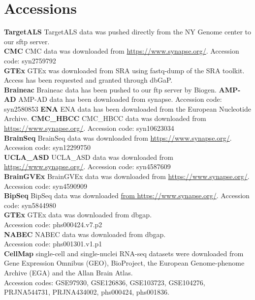 \section*{Accessions}
\textbf{TargetALS} TargetALS data was pushed directly from the NY Genome center to our sftp server. \\
\textbf{CMC} CMC data was downloaded from \url{https://www.synapse.org/}. Accession code: syn2759792 \\
\textbf{GTEx} GTEx was downloaded from SRA using fastq-dump of the SRA toolkit. Access has been requested and granted through dbGaP. \\
\textbf{Braineac} Braineac data has been pushed to our ftp server by Biogen. 
\textbf{AMP-AD} AMP-AD data has been downloaded from synapse. Accession code: syn2580853 
\textbf{ENA} ENA data has been downloaded from the European Nucleotide Archive.
\textbf{CMC\_HBCC} CMC\_HBCC data was downloaded from \url{https://www.synapse.org/}. Accession code: syn10623034 \\
\textbf{BrainSeq} BrainSeq data was downloaded from \url{https://www.synapse.org/}. Accession code: syn12299750 \\
\textbf{UCLA\_ASD} UCLA\_ASD data was downloaded from \url{https://www.synapse.org/}. Accession code: syn4587609 \\
\textbf{BrainGVEx} BrainGVEx data was downloaded from \url{https://www.synapse.org/}. Accession code: syn4590909 \\
\textbf{BipSeq} BipSeq data was downloaded \url{from https://www.synapse.org/}. Accession code: syn5844980 \\
\textbf{GTEx} GTEx data was downloaded from dbgap. \\
Accession code: phs000424.v7.p2 \\
\textbf{NABEC} NABEC data was downloaded from dbgap. \\
Accession code: phs001301.v1.p1 \\
\textbf{CellMap} single-cell and single-nuclei RNA-seq datasets were downloaded from Gene Expression Omnibus (GEO), BioProject, the European Genome-phenome Archive (EGA) and the Allan Brain Atlas. \\
Accession codes: GSE97930, GSE126836, GSE103723, GSE104276, PRJNA544731, PRJNA434002, phs000424, phs001836. 

